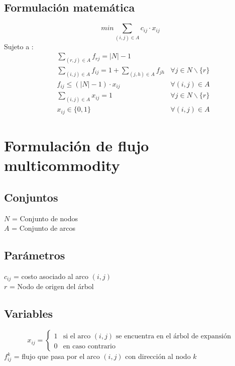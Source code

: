 \documentclass{article}
\numberwithin{equation}{section}
\begin{document}
\subsection{Formulación matemática}
\begin{equation}
min \sum_{(i,j) \in A} c_{ij} \cdot x_{ij}
\end{equation}
Sujeto a : \begin{align}
& \sum_{(r,j) \in A} f_{rj} = |N| - 1\\
& \sum_{(i,j) \in A} f_{ij} = 1 + \sum_{(j,h) \in A} f_{jh} &\forall j \in N \backslash \{r\} \\
& f_{ij} \leq (|N| - 1)\cdot x_{ij} &\forall (i,j) \in A\\
& \sum_{(i,j) \in A} x_{ij} = 1 &\forall j \in N \backslash \{r\}\\
& x_{ij} \in \{0,1\} &\forall (i,j) \in A
\end{align}

\newpage
\section{Formulación de flujo multicommodity}
\subsection{Conjuntos}
$N$ = Conjunto de nodos\\
$A$ = Conjunto de arcos
\subsection{Parámetros}
$c_{ij}$ = costo asociado al arco $(i,j)$\\
$r$ = Nodo de origen del árbol
\subsection{Variables}
\begin{center}
\[x_{ij}={\begin{cases}1&{\mbox{si el arco $(i,j)$ se encuentra en el árbol de expansión}}\\0&{\mbox{en caso contrario}}\end{cases}}
\]
$f_{ij}^k$ = flujo que pasa por el arco $(i,j)$ con dirección al nodo $k$
\end{center}
\end{document}
